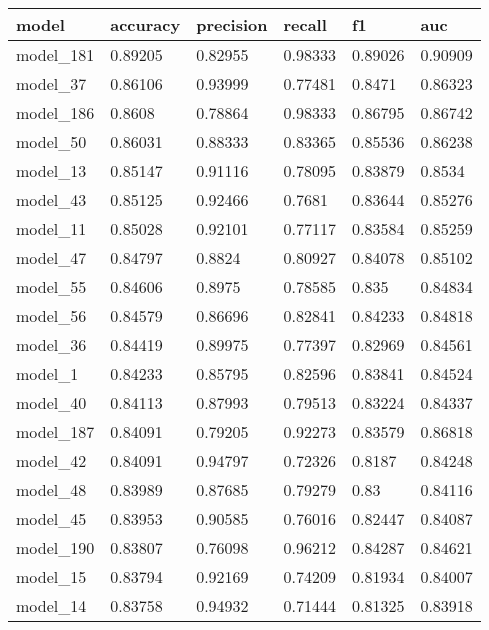 \begin{tabular}{|l|l|l|l|l|l|}
\hline
\textbf{model} & \textbf{accuracy} & \textbf{precision} & \textbf{recall} & \textbf{f1} & \textbf{auc} \\ \hline
model\_181     & 0.89205           & 0.82955            & 0.98333         & 0.89026     & 0.90909      \\ \hline
model\_37      & 0.86106           & 0.93999            & 0.77481         & 0.8471      & 0.86323      \\ \hline
model\_186     & 0.8608            & 0.78864            & 0.98333         & 0.86795     & 0.86742      \\ \hline
model\_50      & 0.86031           & 0.88333            & 0.83365         & 0.85536     & 0.86238      \\ \hline
model\_13      & 0.85147           & 0.91116            & 0.78095         & 0.83879     & 0.8534       \\ \hline
model\_43      & 0.85125           & 0.92466            & 0.7681          & 0.83644     & 0.85276      \\ \hline
model\_11      & 0.85028           & 0.92101            & 0.77117         & 0.83584     & 0.85259      \\ \hline
model\_47      & 0.84797           & 0.8824             & 0.80927         & 0.84078     & 0.85102      \\ \hline
model\_55      & 0.84606           & 0.8975             & 0.78585         & 0.835       & 0.84834      \\ \hline
model\_56      & 0.84579           & 0.86696            & 0.82841         & 0.84233     & 0.84818      \\ \hline
model\_36      & 0.84419           & 0.89975            & 0.77397         & 0.82969     & 0.84561      \\ \hline
model\_1       & 0.84233           & 0.85795            & 0.82596         & 0.83841     & 0.84524      \\ \hline
model\_40      & 0.84113           & 0.87993            & 0.79513         & 0.83224     & 0.84337      \\ \hline
model\_187     & 0.84091           & 0.79205            & 0.92273         & 0.83579     & 0.86818      \\ \hline
model\_42      & 0.84091           & 0.94797            & 0.72326         & 0.8187      & 0.84248      \\ \hline
model\_48      & 0.83989           & 0.87685            & 0.79279         & 0.83        & 0.84116      \\ \hline
model\_45      & 0.83953           & 0.90585            & 0.76016         & 0.82447     & 0.84087      \\ \hline
model\_190     & 0.83807           & 0.76098            & 0.96212         & 0.84287     & 0.84621      \\ \hline
model\_15      & 0.83794           & 0.92169            & 0.74209         & 0.81934     & 0.84007      \\ \hline
model\_14      & 0.83758           & 0.94932            & 0.71444         & 0.81325     & 0.83918      \\ \hline
\end{tabular}